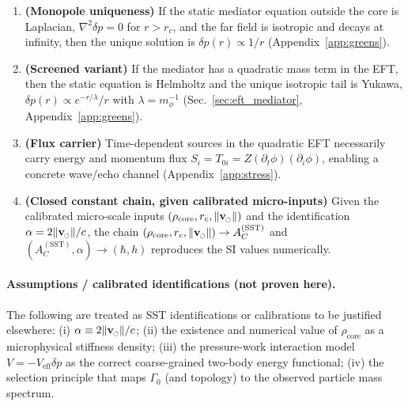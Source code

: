 \documentclass[pdflatex,sn-mathphys-num]{revtex4-2}
\newcommand{\swirlarrow}{\mathchoice{\mkern-2mu\scriptstyle\boldsymbol{\circlearrowleft}}{\mkern-2mu\scriptstyle\boldsymbol{\circlearrowleft}}{\mkern-2mu\scriptscriptstyle\boldsymbol{\circlearrowleft}}{\mkern-2mu\scriptscriptstyle\boldsymbol{\circlearrowleft}}}
\newcommand{\rhocore}{\rho_{\text{core}}}
\newcommand{\vswirl}{\mathbf{v}_{\swirlarrow}}
\newcommand{\vnorm}{\lVert \vswirl \rVert}
\providecommand{\rc}{r_c}
\newcommand{\clight}{c}
\begin{document}
            \begin{enumerate}
                \item \textbf{(Monopole uniqueness)} If the static mediator equation outside the core is Laplacian,
                \(\nabla^2 \delta p=0\) for \(r>\rc\), and the far field is isotropic and decays at infinity, then the
                unique solution is \(\delta p(r)\propto 1/r\) (Appendix~\ref{app:greens}).

                \item \textbf{(Screened variant)} If the mediator has a quadratic mass term in the EFT, then the static
                equation is Helmholtz and the unique isotropic tail is Yukawa,
                \(\delta p(r)\propto e^{-r/\lambda}/r\) with \(\lambda=m_\phi^{-1}\) (Sec.~\ref{sec:eft_mediator},
                Appendix~\ref{app:greens}).

                \item \textbf{(Flux carrier)} Time-dependent sources in the quadratic EFT necessarily carry energy and momentum
                flux \(S_i=T_{0i}=Z(\partial_t\phi)(\partial_i\phi)\), enabling a concrete wave/echo channel (Appendix~\ref{app:stress}).

                \item \textbf{(Closed constant chain, given calibrated micro-inputs)} Given the calibrated micro-scale inputs
                \((\rhocore,\rc,\vnorm)\) and the identification \(\alpha=2\vnorm/\clight\), the chain
                \((\rhocore,\rc,\vnorm)\to A_C^{\mathrm{(SST)}}\) and \((A_C^{\mathrm{(SST)}},\alpha)\to(\hbar,h)\) reproduces the SI values numerically.
            \end{enumerate}

        \paragraph{Assumptions / calibrated identifications (not proven here).}
            The following are treated as SST identifications or calibrations to be justified elsewhere:
            (i) \(\alpha \equiv 2\vnorm/\clight\);
            (ii) the existence and numerical value of \(\rhocore\) as a microphysical stiffness density;
            (iii) the pressure-work interaction model \(V=-V_{\mathrm{eff}}\delta p\) as the correct coarse-grained
            two-body energy functional;
            (iv) the selection principle that maps \(\Gamma_0\) (and topology) to the observed particle mass spectrum.
\end{document}
